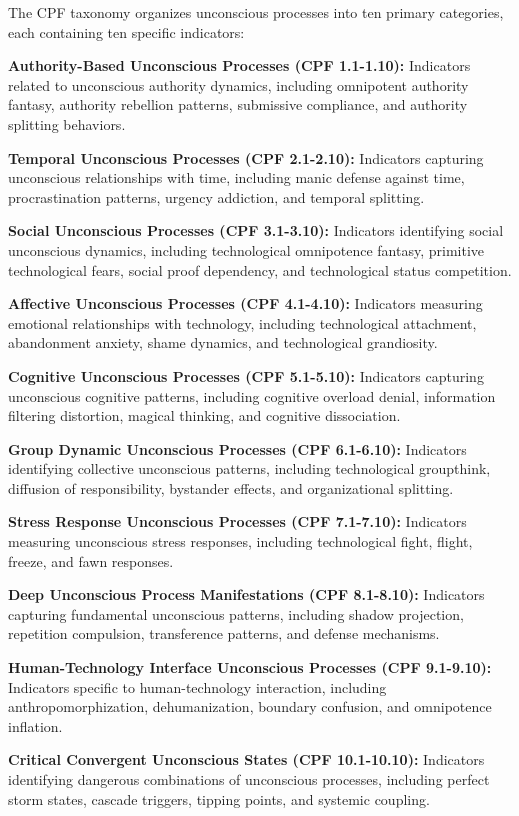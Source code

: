 \documentclass[10pt, twocolumn]{article}
\begin{document}
The CPF taxonomy organizes unconscious processes into ten primary categories, each containing ten specific indicators:

\textbf{Authority-Based Unconscious Processes (CPF 1.1-1.10):} Indicators related to unconscious authority dynamics, including omnipotent authority fantasy, authority rebellion patterns, submissive compliance, and authority splitting behaviors.

\textbf{Temporal Unconscious Processes (CPF 2.1-2.10):} Indicators capturing unconscious relationships with time, including manic defense against time, procrastination patterns, urgency addiction, and temporal splitting.

\textbf{Social Unconscious Processes (CPF 3.1-3.10):} Indicators identifying social unconscious dynamics, including technological omnipotence fantasy, primitive technological fears, social proof dependency, and technological status competition.

\textbf{Affective Unconscious Processes (CPF 4.1-4.10):} Indicators measuring emotional relationships with technology, including technological attachment, abandonment anxiety, shame dynamics, and technological grandiosity.

\textbf{Cognitive Unconscious Processes (CPF 5.1-5.10):} Indicators capturing unconscious cognitive patterns, including cognitive overload denial, information filtering distortion, magical thinking, and cognitive dissociation.

\textbf{Group Dynamic Unconscious Processes (CPF 6.1-6.10):} Indicators identifying collective unconscious patterns, including technological groupthink, diffusion of responsibility, bystander effects, and organizational splitting.

\textbf{Stress Response Unconscious Processes (CPF 7.1-7.10):} Indicators measuring unconscious stress responses, including technological fight, flight, freeze, and fawn responses.

\textbf{Deep Unconscious Process Manifestations (CPF 8.1-8.10):} Indicators capturing fundamental unconscious patterns, including shadow projection, repetition compulsion, transference patterns, and defense mechanisms.

\textbf{Human-Technology Interface Unconscious Processes (CPF 9.1-9.10):} Indicators specific to human-technology interaction, including anthropomorphization, dehumanization, boundary confusion, and omnipotence inflation.

\textbf{Critical Convergent Unconscious States (CPF 10.1-10.10):} Indicators identifying dangerous combinations of unconscious processes, including perfect storm states, cascade triggers, tipping points, and systemic coupling.
\end{document}
